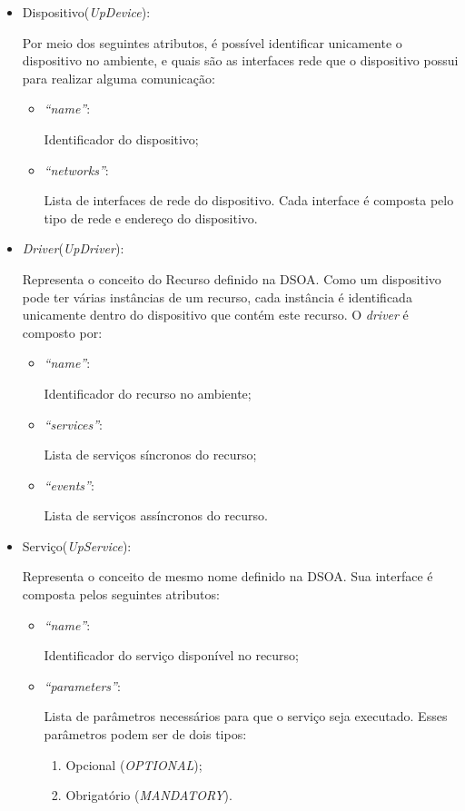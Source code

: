 \begin{itemize}
	\item Dispositivo(\emph{UpDevice}):
	
		Por meio dos seguintes atributos, é possível identificar unicamente o dispositivo no ambiente, e quais são as interfaces rede que o dispositivo possui para realizar alguma comunicação:
		\begin{itemize}
			\item \emph{``name''}: 
			
			Identificador do dispositivo;
			\item \emph{``networks''}: 

			Lista de interfaces de rede do dispositivo. Cada interface é composta pelo tipo de rede e endereço do dispositivo.
		\end{itemize}
	\item \emph{Driver}(\emph{UpDriver}): 

		Representa o conceito do Recurso definido na DSOA. Como um dispositivo pode ter várias instâncias de um recurso, cada instância é identificada unicamente dentro do dispositivo que contém este recurso. O \emph{driver} é composto por:
		\begin{itemize}
			\item \emph{``name''}:

				Identificador do recurso no ambiente;
			\item \emph{``services''}:
				
				Lista de serviços síncronos do recurso;
			\item \emph{``events''}:
				
				Lista de serviços assíncronos do recurso.
		\end{itemize}
	\item Serviço(\emph{UpService}): 

		Representa o conceito de mesmo nome definido na DSOA. Sua interface é composta pelos seguintes atributos:
		\begin{itemize}
			\item \emph{``name''}:

				Identificador do serviço disponível no recurso;
			\item \emph{``parameters''}:
				
				Lista de parâmetros necessários para que o serviço seja executado. Esses parâmetros podem ser de dois tipos:
				\begin{enumerate}
					\item Opcional (\emph{OPTIONAL});
					\item Obrigatório (\emph{MANDATORY}).
				\end{enumerate}
		\end{itemize}
\end{itemize}


